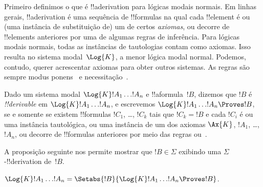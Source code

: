 \documentclass[../../../include/open-logic-section]{subfiles}
\begin{document}


Primeiro definimos o que é !!a{derivation} para lógicas modais
normais. Em linhas gerais, !!a{derivation} é uma sequência de
!!{formula}s na qual cada !!{element} é ou (uma instância de
substituição de) um de certos \emph{axiomas}, ou decorre de
!!{element}s anteriores por uma de algumas regras de inferência. Para
lógicas modais normais, todas as instâncias de
tautologias
contam como axiomas. Isso resulta no sistema modal~$\Log{K}$, a menor
lógica modal normal. Podemos, contudo, querer acrescentar axiomas para
obter outros sistemas. As regras são sempre modus ponens~\MP{} e
necessitação~\Nec.

\begin{defn}
  Dado um sistema modal $\Log{K} !A_1 \dots !A_n$ e !!a{formula}~$!B$,
  dizemos que $!B$ é \emph{!!{derivable}} em $\Log{K} !A_1 \dots
  !A_n$, e escrevemos $\Log{K} !A_1 \dots !A_n \Proves !B$, se e
  somente se existem !!{formula}s $!C_1$, \dots, $!C_k$ tais que
  $!C_k = !B$ e cada $!C_i$ é ou uma instância tautológica, ou uma
  instância de um dos axiomas $\Ax{K}$,
  $!A_1$, \dots, $!A_n$, ou decorre de !!{formula}s anteriores por
  meio das regras \MP{} ou~\Nec.
\end{defn}

A proposição seguinte nos permite mostrar que $!B \in \Sigma$
exibindo uma $\Sigma$-!!{derivation} de~$!B$.

\begin{prop}
  $\Log{K} !A_1 \dots !A_n = \Setabs{!B}{\Log{K} !A_1 \dots !A_n \Proves !B}$.
\end{prop}
\end{document}
